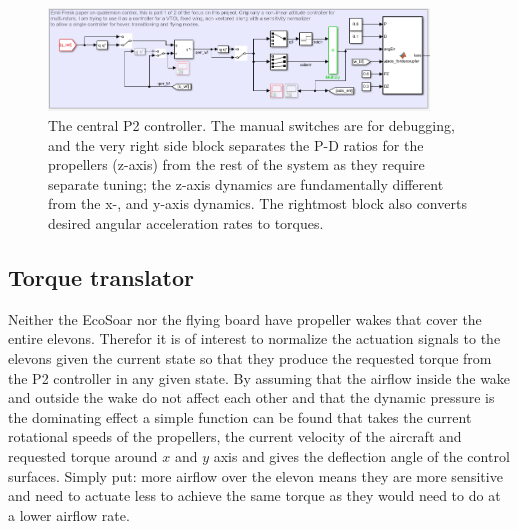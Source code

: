 \documentclass{article}
\begin{document}
\begin{figure}
    \center
    \includegraphics[width=0.9\textwidth]{P2.PNG}
    \caption{The central P2 controller. The manual switches are for debugging, and the very right side block separates the P-D ratios for the propellers (z-axis) from the rest of the system as they require separate tuning; the z-axis dynamics are fundamentally different from the x-, and y-axis dynamics. The rightmost block also converts desired angular acceleration rates to torques.}
    \label{fig:P2_simulink}
\end{figure}

\subsection{Torque translator}
Neither the EcoSoar nor the flying board have propeller wakes that cover the entire elevons.
Therefor it is of interest to normalize the actuation signals to the elevons given the current state so that they produce the requested torque from the P2 controller in any given state.
By assuming that the airflow inside the wake and outside the wake do not affect each other and that the dynamic pressure is the dominating effect a simple function can be found that takes the current rotational speeds of the propellers, the current velocity of the aircraft and requested torque around $x$ and $y$ axis and gives the deflection angle of the control surfaces.
Simply put: more airflow over the elevon means they are more sensitive and need to actuate less to achieve the same torque as they would need to do at a lower airflow rate.
\end{document}
